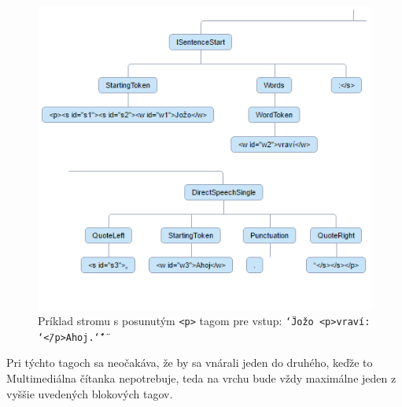 \documentclass[12pt,a4paper]{report}
\theoremstyle{definition}
\theoremstyle{remark}
\begin{document}
\begin{figure}[H]
\centering
\includegraphics[scale=2.6]{adjustedPTags}
\captionsetup{width=.55\linewidth}
\setlength{\belowcaptionskip}{-15pt}
\setlength{\abovecaptionskip}{0pt}
\caption{Príklad stromu s posunutým \texttt{<p>} tagom pre vstup: \texttt{\char`\"Jožo <p>vraví: \char`\"</p>Ahoj.\char`\"\char`\"}}
\end{figure}
Pri týchto tagoch sa neočakáva, že by sa vnárali jeden do druhého, keďže to Multimediálna čítanka nepotrebuje, teda na vrchu bude vždy maximálne jeden z vyššie uvedených blokových tagov.
\end{document}
